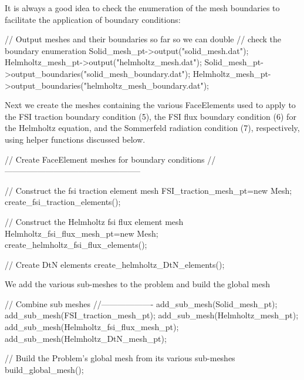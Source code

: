 It is always a good idea to check the enumeration of the mesh boundaries to facilitate the application of boundary conditions\+:


\begin{DoxyCodeInclude}

 \textcolor{comment}{// Output meshes and their boundaries so far so we can double }
 \textcolor{comment}{// check the boundary enumeration}
 Solid\_mesh\_pt->output(\textcolor{stringliteral}{"solid\_mesh.dat"});
 Helmholtz\_mesh\_pt->output(\textcolor{stringliteral}{"helmholtz\_mesh.dat"});
 Solid\_mesh\_pt->output\_boundaries(\textcolor{stringliteral}{"solid\_mesh\_boundary.dat"});
 Helmholtz\_mesh\_pt->output\_boundaries(\textcolor{stringliteral}{"helmholtz\_mesh\_boundary.dat"});

\end{DoxyCodeInclude}


Next we create the meshes containing the various {\ttfamily Face\+Elements} used to apply to the F\+SI traction boundary condition (5), the F\+SI flux boundary condition (6) for the Helmholtz equation, and the Sommerfeld radiation condition (7), respectively, using helper functions discussed below.


\begin{DoxyCodeInclude}

 \textcolor{comment}{// Create FaceElement meshes for boundary conditions}
 \textcolor{comment}{//--------------------------------------------------}
 
 \textcolor{comment}{// Construct the fsi traction element mesh}
 FSI\_traction\_mesh\_pt=\textcolor{keyword}{new} Mesh;
 create\_fsi\_traction\_elements();
 
 \textcolor{comment}{// Construct the Helmholtz fsi flux element mesh}
 Helmholtz\_fsi\_flux\_mesh\_pt=\textcolor{keyword}{new} Mesh;
 create\_helmholtz\_fsi\_flux\_elements();
 
 \textcolor{comment}{// Create DtN elements}
 create\_helmholtz\_DtN\_elements();

\end{DoxyCodeInclude}


We add the various sub-\/meshes to the problem and build the global mesh


\begin{DoxyCodeInclude}


 \textcolor{comment}{// Combine sub meshes}
 \textcolor{comment}{//-------------------}
 add\_sub\_mesh(Solid\_mesh\_pt);
 add\_sub\_mesh(FSI\_traction\_mesh\_pt);
 add\_sub\_mesh(Helmholtz\_mesh\_pt);
 add\_sub\_mesh(Helmholtz\_fsi\_flux\_mesh\_pt);
 add\_sub\_mesh(Helmholtz\_DtN\_mesh\_pt); 
 
 \textcolor{comment}{// Build the Problem's global mesh from its various sub-meshes}
 build\_global\_mesh();

\end{DoxyCodeInclude}


